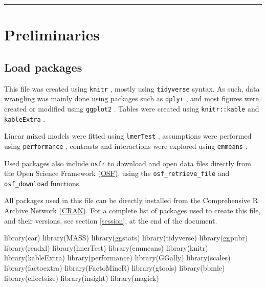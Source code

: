 \documentclass[
  bookmarksnumbered]{article}
\newenvironment{Shaded}{\begin{snugshade}}{\end{snugshade}}
\newcommand{\FunctionTok}[1]{\textcolor[rgb]{0.94,0.94,0.56}{#1}}
\newcommand{\NormalTok}[1]{\textcolor[rgb]{0.80,0.80,0.80}{#1}}
\begin{document}
\begin{center}\rule{0.5\linewidth}{0.5pt}\end{center}

\section{Preliminaries}\label{preliminaries}

\subsection{Load packages}\label{load-packages}

This file was created using \texttt{knitr} \autocite{knitrcit}, mostly using \texttt{tidyverse} \autocite{tidyversecit} syntax. As such, data wrangling was mainly done using packages such as \texttt{dplyr} \autocite{dplyrcit}, and most figures were created or modified using \texttt{ggplot2} \autocite{ggplotcit}. Tables were created using \texttt{knitr::kable} and \texttt{kableExtra} \autocite{kableExtracit}.

Linear mixed models were fitted using \texttt{lmerTest} \autocite{lmertestcit}, assumptions were performed using \texttt{performance} \autocite{ludecke2021}, contrasts and interactions were explored using \texttt{emmeans} \autocite{emmeanscit}.

Used packages also include \texttt{osfr} \autocite{osfrcit} to download and open data files directly from the Open Science Framework (\href{https://osf.io/}{OSF}), using the \texttt{osf\_retrieve\_file} and \texttt{osf\_download} functions.

All packages used in this file can be directly installed from the Comprehensive R Archive Network (\href{https://cran.r-project.org/}{CRAN}). For a complete list of packages used to create this file, and their versions, see section \ref{session}, at the end of the document.

\begin{Shaded}
\begin{Highlighting}[]
\FunctionTok{library}\NormalTok{(car)}
\FunctionTok{library}\NormalTok{(MASS)}
\FunctionTok{library}\NormalTok{(ggstats)}
\FunctionTok{library}\NormalTok{(tidyverse)}
\FunctionTok{library}\NormalTok{(ggpubr)}
\FunctionTok{library}\NormalTok{(readxl)}
\FunctionTok{library}\NormalTok{(lmerTest)}
\FunctionTok{library}\NormalTok{(emmeans)}
\FunctionTok{library}\NormalTok{(knitr)}
\FunctionTok{library}\NormalTok{(kableExtra)}
\FunctionTok{library}\NormalTok{(performance)}
\FunctionTok{library}\NormalTok{(GGally)}
\FunctionTok{library}\NormalTok{(scales)}
\FunctionTok{library}\NormalTok{(factoextra)}
\FunctionTok{library}\NormalTok{(FactoMineR)}
\FunctionTok{library}\NormalTok{(gtools)}
\FunctionTok{library}\NormalTok{(bbmle)}
\FunctionTok{library}\NormalTok{(effectsize)}
\FunctionTok{library}\NormalTok{(insight)}
\FunctionTok{library}\NormalTok{(magick)}
\end{Highlighting}
\end{Shaded}
\end{document}
